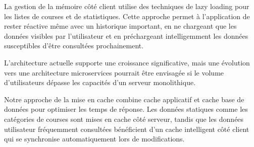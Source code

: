 La gestion de la mémoire côté client utilise des techniques de lazy loading pour les listes de courses et de statistiques. Cette approche permet à l'application de rester réactive même avec un historique important, en ne chargeant que les données visibles par l'utilisateur et en préchargeant intelligemment les données susceptibles d'être consultées prochainement.

\begin{warningbox}
L'architecture actuelle supporte une croissance significative, mais une évolution vers une architecture microservices pourrait être envisagée si le volume d'utilisateurs dépasse les capacités d'un serveur monolithique.
\end{warningbox}

Notre approche de la mise en cache combine cache applicatif et cache base de données pour optimiser les temps de réponse. Les données statiques comme les catégories de courses sont mises en cache côté serveur, tandis que les données utilisateur fréquemment consultées bénéficient d'un cache intelligent côté client qui se synchronise automatiquement lors de modifications.
